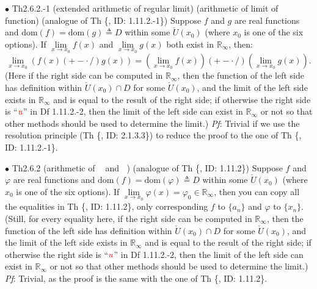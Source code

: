\documentclass{article}
\begin{document}
\begin{Th}{$\bullet$ Th2.6.2.-1 (extended arithmetic of regular limit) (arithmetic of limit of function) (analogue of Th \{, ID: 1.11.2.-1\})}
    Suppose $f$ and $g$ are real functions and $\text{dom}(f) = \text{dom}(g)\triangleq D$ within some $\check{U}(x_0)$ (where $x_0$ is one of the six options). If $\lim\limits_{x\to x_0} f(x)$ and $\lim\limits_{x\to x_0} g(x)$ both exist in $\mathbb{R}_\infty$, then:
    $$ \lim\limits_{x\to x_0}\left(f(x)(+-\cdot\,/)g(x)\right) = \left(\lim\limits_{x\to x_0} f(x)\right)(+-\cdot\,/) \left(\lim\limits_{x\to x_0} g(x)\right).$$
    (Here if the right side can be computed in $\mathbb{R}_\infty$, then the function of the left side has definition within $\check{U}(x_0)\cap D$ for some $\check{U}(x_0)$, and the limit of the left side exists in $\mathbb{R}_\infty$ and is equal to the result of the right side; if otherwise the right side is ``$\textcolor{red}{u}$'' in Df 1.11.2.-2, then the limit of the left side can exist in $\mathbb{R}_\infty$ or not so that other methods should be used to determine the limit.)
    \tcblower
    \textit{Pf}: Trivial if we use the resolution principle (Th \{, ID: 2.1.3.3\}) to reduce the proof to the one of Th \{, ID: 1.11.2.-1\}.
\end{Th}

\begin{Th}{$\bullet$ Th2.6.2 (arithmetic of $\mathop{\overline{\lim}}$ and $\mathop{\underline{\lim}}$) (analogue of Th \{, ID: 1.11.2\})}
    Suppose $f$ and $\varphi$ are real functions and $\text{dom}(f) = \text{dom}(\varphi)\triangleq D$ within some $\check{U}(x_0)$ (where $x_0$ is one of the six options). If $\lim\limits_{x\to x_0} \varphi(x) = \varphi_0\in\mathbb{R}_\infty$, then you can copy all the equalities in Th \{, ID: 1.11.2\}, only corresponding $f$ to $\{a_n\}$ and $\varphi$ to $\{x_n\}$. \\
    (Still, for every equality here, if the right side can be computed in $\mathbb{R}_\infty$, then the function of the left side has definition within $\check{U}(x_0)\cap D$ for some $\check{U}(x_0)$, and the limit of the left side exists in $\mathbb{R}_\infty$ and is equal to the result of the right side; if otherwise the right side is ``$\textcolor{red}{u}$'' in Df 1.11.2.-2, then the limit of the left side can exist in $\mathbb{R}_\infty$ or not so that other methods should be used to determine the limit.)
    \tcblower
    \textit{Pf}: Trivial, as the proof is the same with the one of Th \{, ID: 1.11.2\}.
\end{Th}
\end{document}
